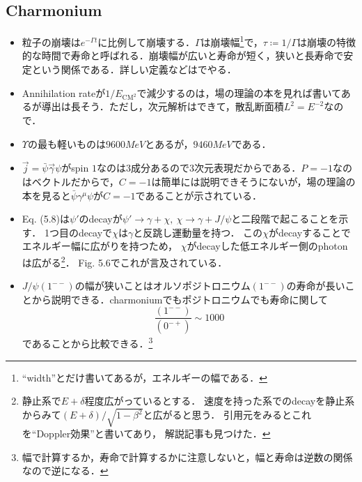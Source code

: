 \subsection{Charmonium}
\begin{itemize}
		\item 粒子の崩壊は$e^{-\Gamma t} $に比例して崩壊する．$\Gamma $は崩壊幅\footnote{``width''とだけ書いてあるが，エネルギーの幅である．}で，$\tau \coloneqq 1/\Gamma $は崩壊の特徴的な時間で寿命と呼ばれる．崩壊幅が広いと寿命が短く，狭いと長寿命で安定という関係である．詳しい定義などは\cite[Chap.7]{Peskin:2019iig}でやる．
		\item Annihilation rateが$1/E_{\mathrm{CM}^2}$で減少するのは，場の理論の本を見れば書いてあるが導出は長そう\cite[Chap1, Chap5]{Peskin:1995ev}．ただし，次元解析はできて，散乱断面積$\unit{L^2} = \unit{E^{-2}} $なので．
		\item $\Upsilon $の最も軽いものは$9600\unit{MeV} $とあるが，$9460\unit{MeV} $である．
		\item $\vec{j} = \bar{\psi}\vec{\gamma}\psi $がspin $1 $なのは$3 $成分あるので$3 $次元表現だからである．$P=-1 $なのはベクトルだからで，$C=-1 $は簡単には説明できそうにないが，場の理論の本を見ると$\bar{\psi}\gamma^{\mu}\psi $が$C=-1 $であることが示されている\cite[Chap.3]{Peskin:1995ev}．
		\item Eq. (5.8)は$\psi' $のdecayが$\psi'\to \gamma + \chi, \ \chi \to \gamma + J/\psi $と二段階で起こることを示す．
				1つ目のdecayで$\chi $は$\gamma $と反跳し運動量を持つ．
				この$\chi $がdecayすることでエネルギー幅に広がりを持つため，
				$\chi $がdecayした低エネルギー側のphotonは広がる\footnote{
						静止系で$E + \delta $程度広がっているとする．
						速度を持った系でのdecayを静止系からみて$(E + \delta)/\sqrt{1-\beta^2} $と広がると思う．
						引用元\cite{Tanenbaum1978}をみるとこれを``Doppler効果''と書いてあり，
						解説記事\cite{1979342}も見つけた．
				}．
				Fig. 5.6でこれが言及されている．
		\item $J/\psi(1^{--}) $の幅が狭いことはオルソポジトロニウム$(1^{--}) $の寿命が長いことから説明できる．charmoniumでもポジトロニウムでも寿命に関して
				\begin{equation}
						\frac{(1^{--})}{(0^{-+})} \sim 1000
				\end{equation}
				であることから比較できる．\footnote{幅で計算するか，寿命で計算するかに注意しないと，幅と寿命は逆数の関係なので逆になる．}
\end{itemize}
